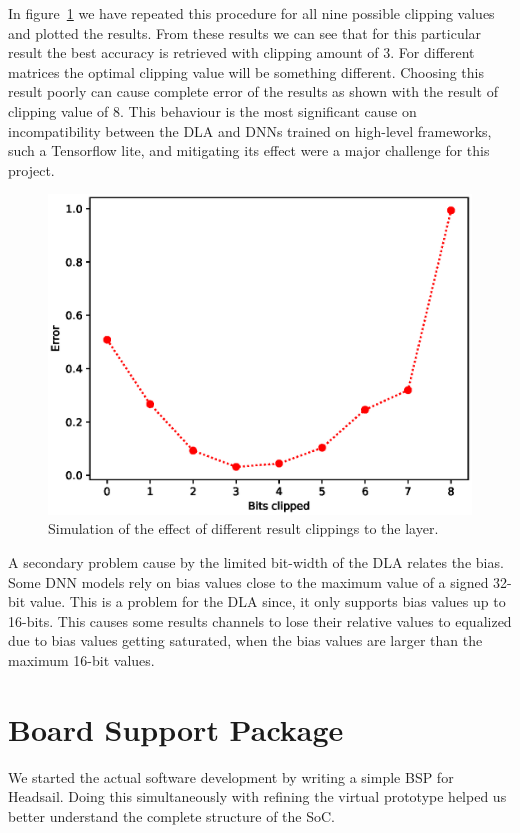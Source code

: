 \documentclass[12pt,a4paper,english
]{tunithesis}
\begin{document}
In figure~\ref{fig:clipping} we have repeated this procedure for all nine possible clipping values and plotted the results. From these results we can see that for this particular result the best accuracy is retrieved with clipping amount of 3. For different matrices the optimal clipping value will be something different. Choosing this result poorly can cause complete error of the results as shown with the result of clipping value of 8.
This behaviour is the most significant cause on incompatibility between the DLA and DNNs trained on high-level frameworks, such a Tensorflow lite, and mitigating its effect were a major challenge for this project.

\begin{figure}
  \centering
  \includegraphics[width=0.85\linewidth]{img/clipping.eps}
  \caption{Simulation of the effect of different result clippings to the layer.}
  \label{fig:clipping}
\end{figure}

A secondary problem cause by the limited bit-width of the DLA relates the bias. Some DNN models rely on bias values close to the maximum value of a signed 32-bit value. This is a problem for the DLA since, it only supports bias values up to 16-bits. This causes some results channels to lose their relative values to equalized due to bias values getting saturated, when the bias values are larger than the maximum 16-bit values.

\section{Board Support Package}
\label{sec:software_support}
We started the actual software development by writing a simple BSP for Headsail. Doing this simultaneously with refining the virtual prototype helped us better understand the complete structure of the SoC.
\end{document}
